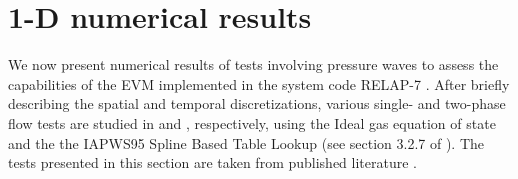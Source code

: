 \documentclass{inputs/mc2015}
\begin{document}
\section{1-D numerical results}\label{sec:results}
%
%
We now present numerical results of tests involving pressure waves to assess the capabilities of the EVM implemented in the system code RELAP-7 \cite{Berry_Peterson_2014}. After briefly describing the spatial and temporal discretizations, various single- and two-phase flow tests are studied in  and , respectively, using the Ideal gas equation of state and the the IAPWS95 Spline Based Table Lookup (see section 3.2.7 of \cite{Berry_Peterson_2014}). The tests presented in this section are taken from published literature \cite{Sokolowski-Koszela, Serre-bestion}.
%
%

%
\end{document}

